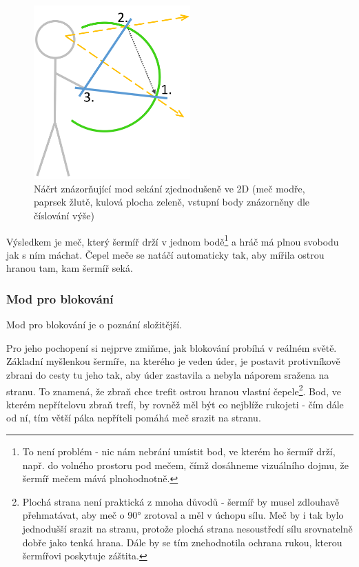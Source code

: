\begin{figure}[ht]\centering
    \center
    \includegraphics[width=60mm]{../img/diagram-slashingMode.png}
    \caption{Náčrt znázorňující mod sekání zjednodušeně ve 2D (meč modře, paprsek žlutě, kulová plocha zeleně, vstupní body znázorněny dle číslování výše)}
    \label{obr04:swordSlashingMode2D}
\end{figure} 
 
Výsledkem je meč, který šermíř drží v jednom bodě\footnote{To není problém - nic nám nebrání umístit bod, ve kterém ho šermíř drží, např. do volného prostoru pod mečem, čímž dosáhneme vizuálního dojmu, že šermíř mečem mává plnohodnotně.} a hráč má plnou svobodu jak s ním máchat. Čepel meče se natáčí automaticky tak, aby mířila ostrou hranou tam, kam šermíř seká.

\subsubsection*{Mod pro blokování} \label{interfacesSwordMovementBlockingModuleSubsubsection}

Mod pro blokování je o poznání složitější.

Pro jeho pochopení si nejprve zmiňme, jak blokování probíhá v reálném světě. Základní myšlenkou šermíře, na kterého je veden úder, je postavit protivníkově zbrani do cesty tu jeho tak, aby úder zastavila a nebyla náporem sražena na stranu. To znamená, že zbraň chce trefit ostrou hranou vlastní čepele\footnote{Plochá strana není praktická z mnoha důvodů - šermíř by musel zdlouhavě přehmatávat, aby meč o 90° zrotoval a měl v úchopu sílu. Meč by i tak bylo jednodušší srazit na stranu, protože plochá strana nesoustředí sílu srovnatelně dobře jako tenká hrana. Dále by se tím znehodnotila ochrana rukou, kterou šermířovi poskytuje záštita.}. Bod, ve kterém nepřítelovu zbraň trefí, by rovněž měl být co nejblíže rukojeti - čím dále od ní, tím větší páka nepříteli pomáhá meč srazit na stranu.

